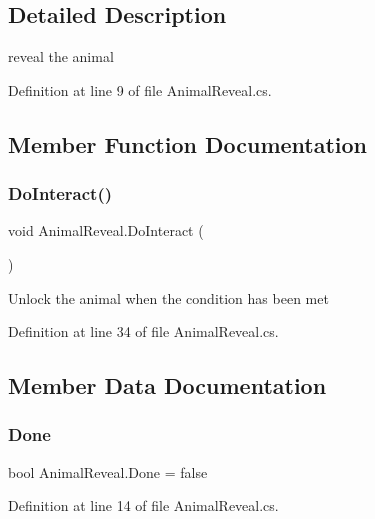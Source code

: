 \subsection{Detailed Description}
reveal the animal 



Definition at line 9 of file Animal\+Reveal.\+cs.



\subsection{Member Function Documentation}
\mbox{\label{class_animal_reveal_a9570da965f4ba4ace6fa35efdcd0450b}} 
\subsubsection{\texorpdfstring{Do\+Interact()}{DoInteract()}}
{\footnotesize\ttfamily void Animal\+Reveal.\+Do\+Interact (\begin{DoxyParamCaption}{ }\end{DoxyParamCaption})}



Unlock the animal when the condition has been met 



Definition at line 34 of file Animal\+Reveal.\+cs.



\subsection{Member Data Documentation}
\mbox{\label{class_animal_reveal_aaf56dad319f6efe32bc2c6c2f65e71aa}} 
\subsubsection{\texorpdfstring{Done}{Done}}
{\footnotesize\ttfamily bool Animal\+Reveal.\+Done = false}



Definition at line 14 of file Animal\+Reveal.\+cs.

\mbox{\label{class_animal_reveal_a18b14a2a76ac60ae8eb2f5161b84b019}} 
